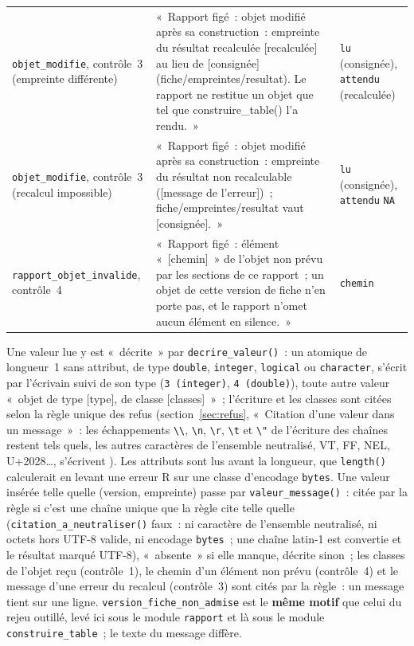 \documentclass[a4paper,11pt]{article}
\newcommand{\code}[1]{\texttt{\small #1}}
\begin{document}
{\begin{longtable}{@{}p{4.7cm}p{7.3cm}p{2.6cm}@{}}
\code{objet\_modifie}, contrôle~3 (empreinte différente) & «~Rapport figé~: objet modifié après sa construction~: empreinte du résultat recalculée [recalculée] au lieu de [consignée] (fiche/empreintes/resultat). Le rapport ne restitue un objet que tel que construire\_table() l'a rendu.~» & \code{lu} (consignée), \code{attendu} (recalculée) \\
\code{objet\_modifie}, contrôle~3 (recalcul impossible) & «~Rapport figé~: objet modifié après sa construction~: empreinte du résultat non recalculable ([message de l'erreur])~; fiche/empreintes/resultat vaut [consignée].~» & \code{lu} (consignée), \code{attendu} \code{NA} \\
\code{rapport\_objet\_invalide}, contrôle~4 & «~Rapport figé~: élément «~[chemin]~» de l'objet non prévu par les sections de ce rapport~; un objet de cette version de fiche n'en porte pas, et le rapport n'omet aucun élément en silence.~» & \code{chemin} \\
\end{longtable}
}

\noindent
Une valeur lue y est «~décrite~» par \code{decrire\_valeur()}~: un atomique
de longueur~1 sans attribut, de type \code{double}, \code{integer},
\code{logical} ou \code{character}, s'écrit par l'écrivain suivi de son
type (\code{3 (integer)}, \code{4 (double)}), toute autre valeur «~objet de
type [type], de classe [classes]~»~; l'écriture et les classes sont citées
selon la règle unique des refus (section~\ref{sec:refus}, «~Citation d'une
valeur dans un message~»~: les échappements \verb|\\|, \verb|\n|,
\verb|\r|, \verb|\t| et \verb|\"| de l'écriture des chaînes restent
tels quels, les autres caractères de l'ensemble neutralisé, VT, FF, NEL,
U+2028\ldots, s'écrivent \code{<U+XXXX>}). Les attributs sont lus avant la
longueur, que \code{length()} calculerait en levant une erreur R sur une
classe d'encodage \code{bytes}. Une valeur insérée telle quelle
(version, empreinte) passe par \code{valeur\_message()}~: citée par la
règle si c'est une chaîne unique que la règle cite telle quelle
(\code{citation\_a\_neutraliser()} faux~: ni caractère de l'ensemble
neutralisé, ni octets hors UTF-8 valide, ni encodage \code{bytes}~; une
chaîne latin-1 est convertie et le résultat marqué UTF-8), «~absente~» si
elle manque, décrite sinon~; les classes de l'objet reçu (contrôle~1), le chemin d'un élément non prévu (contrôle~4)
et le message d'une erreur du recalcul (contrôle~3) sont cités par la
règle~: un message tient sur une ligne. \code{version\_fiche\_non\_admise} est le
\textbf{même motif} que celui du rejeu outillé, levé ici sous le module
\code{rapport} et là sous le module \code{construire\_table}~; le texte du
message diffère.
\end{document}
